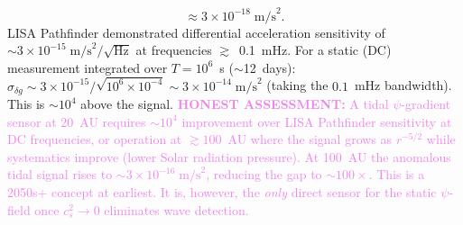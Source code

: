 \documentclass[11pt]{article}
\theoremstyle{definition}
\theoremstyle{remark}
\newcommand{\ee}[1]{\times10^{#1}}
\newcommand{\honest}[1]{\textcolor{violet}{\textbf{HONEST ASSESSMENT:} #1}}
\begin{document}
\begin{tcolorbox}[colback=blue!5!white, colframe=blue!60!black,
  title=\textbf{TOP 5 FINDINGS --- W4i16 P6 (Ranked by Impact)}]
\begin{enumerate}[nosep]
\begin{equation}
    \approx 3\ee{-18}\;\mathrm{m/s}^2.
  \end{equation}
  LISA Pathfinder demonstrated differential acceleration sensitivity
  of $\sim 3\ee{-15}\;\mathrm{m/s}^2/\sqrt{\mathrm{Hz}}$ at
  frequencies $\gtrsim$~0.1~mHz.  For a static (DC) measurement
  integrated over $T = 10^6$~s ($\sim$12~days):
  $\sigma_{\delta g} \sim 3\ee{-15}/\sqrt{10^6 \times 10^{-4}}
  \sim 3\ee{-14}\;\mathrm{m/s}^2$ (taking the $0.1$~mHz bandwidth).
  This is $\sim 10^4$ above the signal.
  \honest{A tidal $\psi$-gradient sensor at 20~AU requires
  $\sim 10^4$ improvement over LISA Pathfinder sensitivity at DC
  frequencies, or operation at $\gtrsim 100$~AU where the signal
  grows as $r^{-5/2}$ while systematics improve (lower Solar
  radiation pressure).  At 100~AU the anomalous tidal signal rises
  to $\sim 3\ee{-16}\;\mathrm{m/s}^2$, reducing the gap to
  $\sim 100\times$.  This is a 2050s+ concept at earliest.
  It is, however, the \emph{only} direct sensor for the static
  $\psi$-field once $c_s^2 \to 0$ eliminates wave detection.}


\end{enumerate}
\end{tcolorbox}
\end{document}
